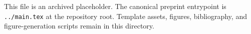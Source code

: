 \documentclass{article}
\begin{document}
This file is an archived placeholder. The canonical preprint entrypoint is
\texttt{../main.tex} at the repository root. Template assets, figures,
bibliography, and figure-generation scripts remain in this directory.
\end{document}

